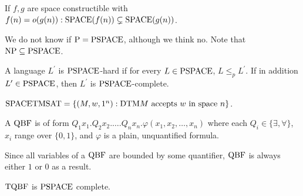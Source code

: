 \begin{note}
  If $f, g$ are space constructible with
  $f(n) = o(g(n)): \mathrm{SPACE}(f(n)) \subsetneq \mathrm{SPACE}(g(n))$.
\end{note}

\begin{note}
  We do not know if $\mathrm{P} = \mathrm{PSPACE}$, although we think no.
  Note that $\mathrm{NP} \subseteq \mathrm{PSPACE}$.
\end{note}

\begin{note}
  A language $L^\prime$ is $\mathrm{PSPACE}$-hard if for every $L \in \mathrm{PSPACE}$,
  $L \leq_p L^\prime$.
  If in addition $L^\prime \in \mathrm{PSPACE}$, then $L^\prime$ is
  $\mathrm{PSPACE}$-complete.
\end{note}

\begin{note}[$\SPACE \TMSAT$]
  $\mathrm{SPACE} \mathrm{TMSAT} = \left\{ (M, w, 1^n) :
    \text{$\mathrm{DTM} M$ accepts $w$ in space $n$} \right\}$.
\end{note}

\begin{note}
  A $\mathrm{QBF}$ is of form
  $Q_1 x_1 . Q_2 x_2 . \dots . Q_n x_n . \varphi (x_1, x_2, \dots, x_n)$
  where each $Q_i \in \{\exists, \forall \}$, $x_i$ range over $\{0, 1\}$,
  and $\varphi$ is a plain, unquantified formula.
\end{note}

\begin{note}
  Since all variables of a $\mathrm{QBF}$ are bounded by some quantifier, $\mathrm{QBF}$ is
  always either $1$ or $0$ as a result.
\end{note}

\begin{note}
  $\mathrm{TQBF}$ is $\mathrm{PSPACE}$ complete.
\end{note}


